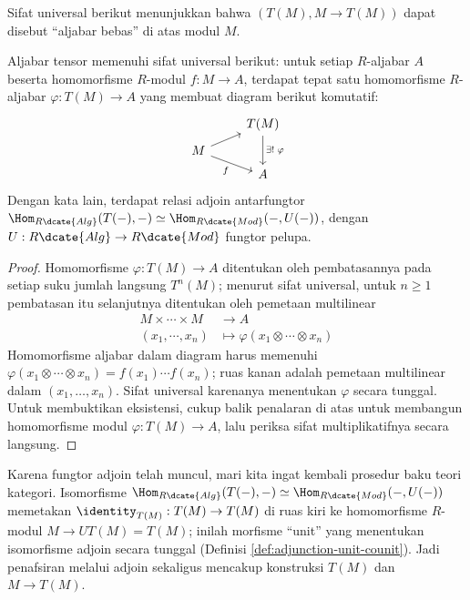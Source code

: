 Sifat universal berikut menunjukkan bahwa $(T(M), M \to T(M))$ dapat disebut ``aljabar bebas'' di atas modul $M$.
\begin{theorem}\label{prop:tensor-alg-universal}
	Aljabar tensor memenuhi sifat universal berikut: untuk setiap $R$-aljabar $A$ beserta homomorfisme $R$-modul $f: M \to A$, terdapat tepat satu homomorfisme $R$-aljabar $\varphi: T(M) \to A$ yang membuat diagram berikut komutatif:
	\[\begin{tikzcd}[row sep=tiny]
		& T(M) \arrow[dd, "\exists! \;\varphi"] \\
		M \arrow[ru] \arrow[rd, "f"'] & \\
		& A
	\end{tikzcd}\]
	Dengan kata lain, terdapat relasi adjoin antarfungtor $\Hom_{R\dcate{Alg}}(T(-), -) \simeq \Hom_{R\dcate{Mod}}(-, U(-))$, dengan $U: R\dcate{Alg} \to R\dcate{Mod}$ fungtor pelupa.
\end{theorem}
\begin{proof}
	Homomorfisme $\varphi: T(M) \to A$ ditentukan oleh pembatasannya pada setiap suku jumlah langsung $T^n(M)$; menurut sifat universal, untuk $n \geq 1$ pembatasan itu selanjutnya ditentukan oleh pemetaan multilinear
	\begin{align*}
		M \times \cdots \times M & \longrightarrow A \\
		(x_1, \cdots, x_n) & \longmapsto \varphi(x_1 \otimes \cdots \otimes x_n)
	\end{align*}
	Homomorfisme aljabar dalam diagram harus memenuhi $\varphi(x_1 \otimes \cdots \otimes x_n) = f(x_1) \cdots f(x_n)$; ruas kanan adalah pemetaan multilinear dalam $(x_1, \ldots, x_n)$. Sifat universal karenanya menentukan $\varphi$ secara tunggal. Untuk membuktikan eksistensi, cukup balik penalaran di atas untuk membangun homomorfisme modul $\varphi: T(M) \to A$, lalu periksa sifat multiplikatifnya secara langsung.
\end{proof}

Karena fungtor adjoin telah muncul, mari kita ingat kembali prosedur baku teori kategori. Isomorfisme $\Hom_{R\dcate{Alg}}(T(-), -) \simeq \Hom_{R\dcate{Mod}}(-, U(-))$ memetakan $\identity_{T(M)}: T(M) \to T(M)$ di ruas kiri ke homomorfisme $R$-modul $M \to UT(M) = T(M)$; inilah morfisme ``unit'' yang menentukan isomorfisme adjoin secara tunggal (Definisi \ref{def:adjunction-unit-counit}). Jadi penafsiran melalui adjoin sekaligus mencakup konstruksi $T(M)$ dan $M \to T(M)$.

